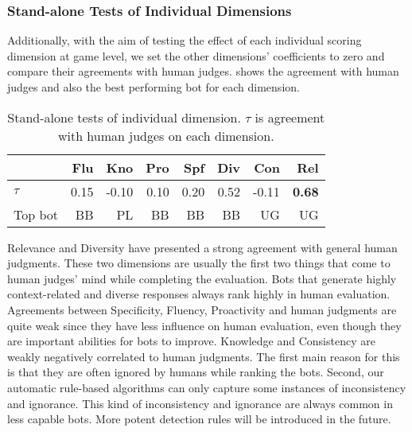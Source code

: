 
\subsubsection*{Stand-alone Tests of Individual Dimensions}
Additionally, with the aim of testing the effect of each individual 
scoring dimension
at game level, we set the other dimensions' coefficients to zero
 and compare their agreements with human judges. 
 shows the agreement with human judges 
and also the best performing bot for each dimension. 
 
\begin{table}[ht!]
\centering
\scriptsize
\begin{tabular}{lrrrrrrr}
\toprule
& Flu& Kno& Pro& Spf& Div& Con & Rel \\ \midrule
$\tau$ & 0.15 &-0.10 &0.10 &0.20 &0.52& -0.11 & \textbf{0.68}  \\
Top bot &BB &PL &BB &BB &BB &UG &UG\\
\bottomrule
\end{tabular}
\caption{Stand-alone tests of individual dimension. $\tau$ is agreement with
human judges on each dimension.} 
\label{tab:stand-alone}
\end{table}

Relevance and Diversity have presented a strong agreement with general human judgments. These two dimensions are usually the first two things that come to human judges' mind while completing the evaluation. Bots that generate highly context-related and diverse responses always rank highly in human evaluation.  
Agreements between Specificity, Fluency, Proactivity and human judgments are quite weak since they have less influence on human evaluation, even though they are important abilities for bots to improve.
Knowledge and Consistency are weakly negatively correlated to human judgments. The first main reason for this is that they are often ignored by humans while ranking the bots. Second, our automatic rule-based algorithms can only 
capture some instances of inconsistency and ignorance.
 This kind of inconsistency and ignorance are always common in less capable bots. More potent detection rules will be introduced in the future.

